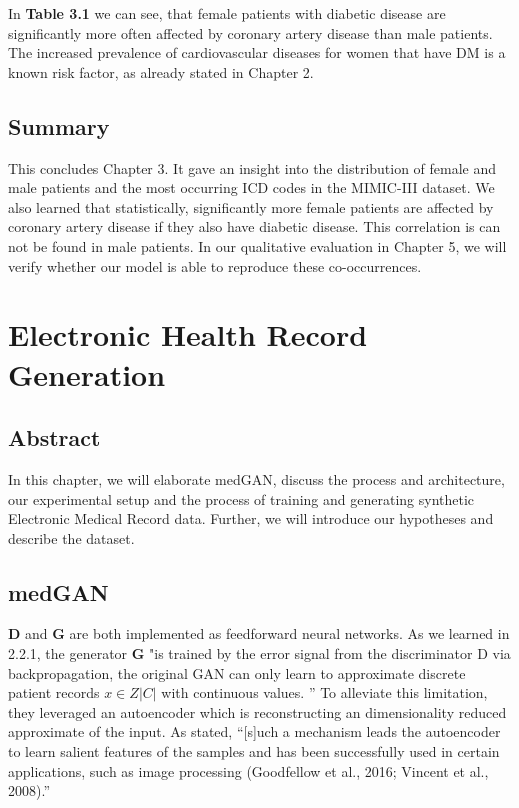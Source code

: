 \documentclass[11pt, a4paper]{book}
\begin{document}
In \textbf{Table 3.1} we can see, that female patients with diabetic disease are significantly more often affected by coronary artery disease than male patients. The increased prevalence of cardiovascular diseases for women that have DM is a known risk factor, as already stated in Chapter 2.


\section{Summary}
This concludes Chapter 3. It gave an insight into the distribution of female and male patients and the most occurring ICD codes in the MIMIC-III dataset. We also learned that statistically, significantly more female patients are affected by coronary artery disease if they also have diabetic disease. This correlation is can not be found in male patients.  
In our qualitative evaluation in Chapter 5, we will verify whether our model is able to reproduce these co-occurrences.

\chapter{Electronic Health Record Generation}
\section{Abstract}
In this chapter, we will elaborate medGAN, discuss the process and architecture, our experimental setup and the process of training and generating synthetic Electronic Medical Record data. Further, we will introduce our hypotheses and describe the dataset.
\section{medGAN}
\textbf{D} and \textbf{G} are both implemented as feedforward neural networks.
As we learned in 2.2.1, the generator \textbf{G} "is trained by the error signal from the discriminator D via backpropagation, the original GAN can only learn to approximate discrete patient records $x \in Z|C|$ with continuous values. ” \cite{Choi2017}
To alleviate this limitation, they leveraged an autoencoder which is reconstructing an dimensionality reduced approximate of the input. As \cite{Choi2017} stated, “[s]uch a mechanism leads the autoencoder to learn salient features of the samples and has been successfully used in certain applications, such as image processing (Goodfellow et al., 2016; Vincent et al., 2008).” 
\end{document}
